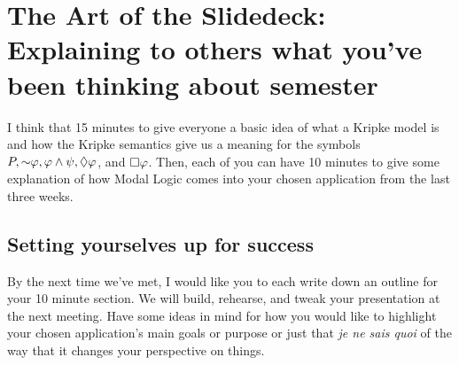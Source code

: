 \chapter[Presentation Preparations]{The Art of the Slidedeck: Explaining to others what you've been thinking about semester}
I think that 15 minutes to give everyone a basic idea of what a Kripke model is and how the Kripke semantics give us a meaning for the symbols
$P, \mathord{\sim} \varphi, \varphi \wedge \psi, \lozenge \varphi$, and $\square \varphi$. Then, each of you can have 10 minutes to 
give some explanation of how Modal Logic comes into your chosen application from the last three weeks.

\setcounter{section}{-1}

\section{Setting yourselves up for success}
By the next time we've met, I would like you to each write down an outline for your 10 minute section. We will build, rehearse,
and tweak your presentation at the next meeting. Have some ideas in mind for how you would like to highlight your chosen
application's main goals or purpose or just that \emph{je ne sais quoi} of the way that it changes your perspective on things.

